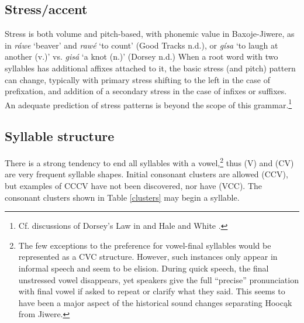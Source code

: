 \documentclass[output=paper]{LSP/langsci}
\begin{document}
\subsection{Stress/accent} 
Stress is both volume and pitch-based, with phonemic value in Baxoje-Jiwere, as in \textit{r\'awe} `beaver' and \textit{raw\'e} `to count' (Good Tracks n.d.), or \textit{g\'isa} `to laugh at another (v.)' vs. \textit{gis\'a}  `a knot (n.)'  (Dorsey n.d.)   When a root word with two syllables has additional affixes attached to it, the basic stress (and pitch) pattern can change, typically with primary stress shifting to the left in the case of prefixation, and addition of a secondary stress in the case of infixes or suffixes.  An adequate prediction of stress patterns is beyond the scope of this grammar.\footnote{Cf. discussions of Dorsey's Law in \citet{Miner1979} and Hale and White \citet{Eagle1980}.} 

\subsection{Syllable structure} There is a strong tendency to end all syllables with a vowel,\footnote{The few exceptions to the preference for vowel-final syllables would be represented as a CVC structure. However, such instances only appear in informal speech and seem to be elision. During quick speech, the final unstressed vowel disappears, yet speakers give the full ``precise'' pronunciation with final vowel if asked to repeat or clarify what they said. This seems to have been a major aspect of the historical sound changes separating Hooc\k{a}k from Jiwere.} thus (V) and (CV) are very frequent syllable shapes. Initial consonant clusters are allowed (CCV), but examples of CCCV have not been discovered, nor have (VCC).  The consonant clusters shown in Table \ref{clusters} may begin a syllable. 
\end{document}
